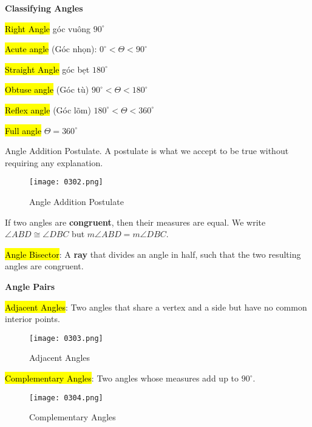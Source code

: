 \vspace{1 cm}

\centerline{\textbf{\huge Classifying Angles}}

\vspace{0.2 cm}

\hl{Right Angle} góc vuông $90^{\circ}$

\hl{Acute angle} (Góc nhọn): $0^{\circ} < \Theta < 90^{\circ}$

\hl{Straight Angle} góc bẹt $180^{\circ}$

\hl{Obtuse angle} (Góc tù) $90^{\circ} < \Theta < 180^{\circ}$

\hl{Reflex angle} (Góc lõm) $180^{\circ} < \Theta < 360^{\circ}$

\hl{Full angle} $\Theta = 360^{\circ}$

\newpage

Angle Addition Postulate. A postulate is what we accept to be true without requiring any explanation.

\begin{figure}[htb!]
  \centering
  \texttt{[image: 0302.png]}
  \caption{Angle Addition Postulate}
\end{figure}

If two angles are \textbf{congruent}, then their measures are equal. We write $\angle ABD \cong \angle DBC$ but $m\angle ABD = m\angle DBC$.

\hl{Angle Bisector}: A \textbf{ray} that divides an angle in half, such that the two resulting angles are congruent.

\vspace{0.9 cm}

\centerline{\textbf{\huge Angle Pairs}}

\vspace{0.2 cm}

\hl{Adjacent Angles}: Two angles that share a vertex and a side but have no common interior points.

\begin{figure}[htb!]
  \centering
  \texttt{[image: 0303.png]}
  \caption{Adjacent Angles}
\end{figure}

\newpage

\hl{Complementary Angles}: Two angles whose measures add up to $90^{\circ}$.

\begin{figure}[htb!]
  \centering
  \texttt{[image: 0304.png]}
  \caption{Complementary Angles}
\end{figure}

